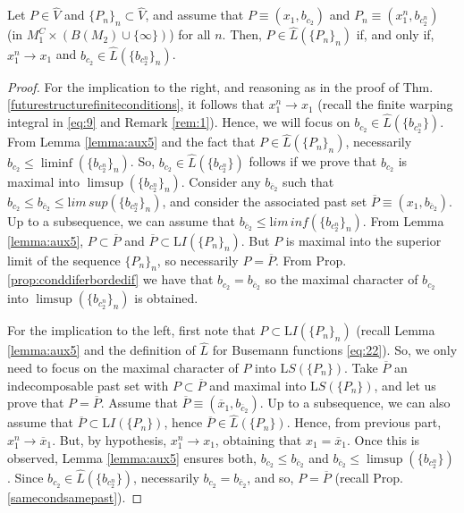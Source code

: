 

  \begin{prop}\label{prop:topcharac} Let $P\in \hat{V}$ and $\{P_n\}_n\subset \hat{V}$, and assume that $P\equiv (x_1,b_{c_2})$ and $P_n\equiv (x_1^n,b_{c_2^n})$ (in $M_1^C\times \left(B(M_2)\cup \{\infty\} \right)$) for all $n$. Then,
$P\in \hat{L}(\{P_n\}_n)$ if, and only if, $x_1^n\rightarrow x_1$ and $b_{c_2}\in \hat{L}(\{b_{c_2^n}\}_n)$.
  \end{prop}
  \begin{proof}
    For the implication to the right, and reasoning as in the proof of Thm. \ref{futurestructurefiniteconditions}, it follows that $x_1^n\rightarrow x_1$ (recall the finite warping integral in \eqref{eq:9} and Remark \ref{rem:1}). Hence, we will focus on $b_{c_2}\in \hat{L}(\{b_{c_2^n}\})$. From Lemma \ref{lemma:aux5} and the fact that $P\in \hat{L}(\{P_n\}_n)$, necessarily $b_{c_2}\leq \liminf(\{b_ {c_2^n}\}_n)$. So, $b_{c_2}\in \hat{L}(\{b_{c_2^n}\})$ follows if we prove that $b_{c_2}$ is maximal into $\limsup(\{b_{c^n_2}\}_n)$. Consider any $b_{\overline{c}_2}$ such that $b_{c_2}\leq b_{\overline{c}_2}\leq {\mathrm lim\,sup}(\{b_{c^n_2}\}_n)$, and consider the associated past set $\overline{P}\equiv (x_1,b_{\overline{c}_2})$. Up to a subsequence, we can assume that $b_{\overline{c}_2}\leq {\mathrm lim\,inf}(\{b_{c^n_2}\}_n)$. From Lemma \ref{lemma:aux5}, $P\subset \overline{P}$ and $\overline{P}\subset {\mathrm LI}(\{P_{n}\}_n)$. But $P$ is maximal into the superior limit of the sequence $\{P_n\}_n$, so necessarily $P=\overline{P}$. From Prop. \ref{prop:conddiferbordedif} we have that $b_{c_2}=b_{\overline{c}_2}$ so the maximal character of $b_{c_2}$ into $\limsup(\{b_{c_2^n}\}_n)$ is obtained.

    \smallskip

    For the implication to the left, first note that $P\subset {\mathrm LI}(\{P_n\}_n)$ (recall Lemma \ref{lemma:aux5} and the definition of $\hat{L}$ for Busemann functions \eqref{eq:22}). So, we only need to focus on the maximal character of $P$ into ${\mathrm LS}(\{P_n\})$. Take $\overline{P}$ an indecomposable past set with $P\subset \overline{P}$ and maximal into ${\mathrm LS}(\{P_n\})$, and let us prove that $P=\overline{P}$. Assume that $\overline{P}\equiv (\overline{x}_1,b_{\overline{c}_2})$. Up to a subsequence, we can also assume that $\overline{P}\subset {\mathrm LI}(\{P_n\})$, hence $\overline{P}\in \hat{L}(\{P_n\})$. Hence, from previous part, $x_1^n\rightarrow \overline{x}_1$. But, by hypothesis, $x_1^n\rightarrow x_1$, obtaining that $x_1=\overline{x}_1$. Once this is observed, Lemma \ref{lemma:aux5} ensures both, $b_{c_2}\leq b_{\overline{c}_2}$ and $b_{\overline{c}_2}\leq \limsup(\{b_{c_2^n}\})$. Since $b_{c_2}\in \hat{L}(\{b_{c_2^n}\})$, necessarily $b_{c_2}=b_{\overline{c}_2}$, and so, $P=\overline{P}$ (recall Prop. \ref{samecondsamepast}).
  \end{proof}

